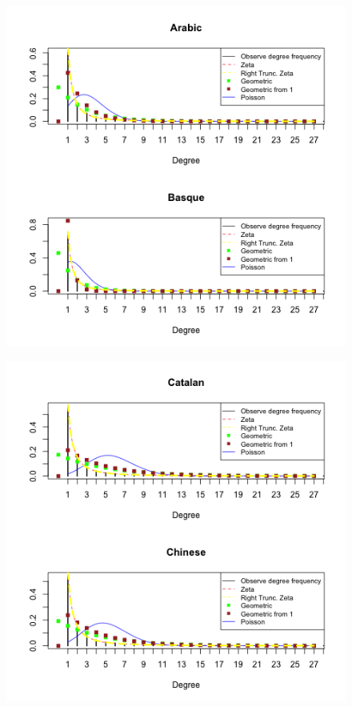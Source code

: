 \documentclass[paper=a4, fontsize=11pt]{scrartcl} %
\theoremstyle{plain}
\begin{document}
\begin{figure}[!htbp] %
   \centering
   \includegraphics[width=\textwidth]{General_1} %
  
\end{figure}

\begin{figure}[htbp] %
   \centering
   \includegraphics[width=\textwidth]{General_2} %

\end{figure}
\end{document}
